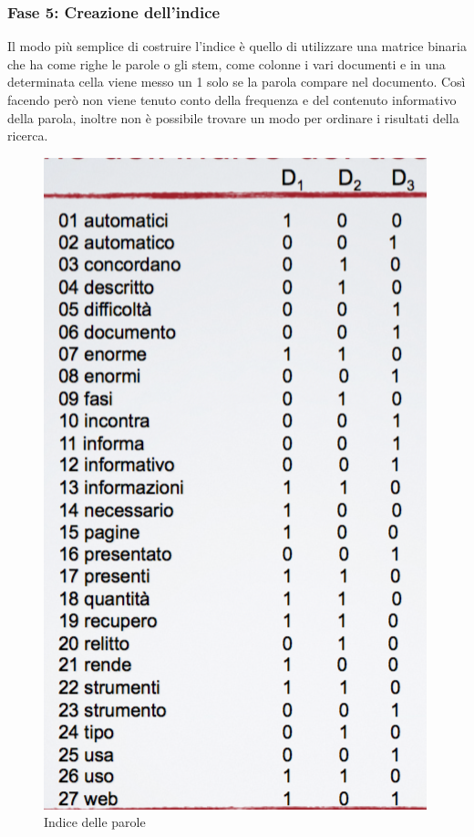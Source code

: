\subsubsection{Fase 5: Creazione dell'indice}

Il modo più semplice di costruire l'indice è quello di utilizzare una matrice binaria che ha come righe le parole o gli stem, come colonne i vari documenti e in una determinata cella viene messo un 1 solo se la parola compare nel documento.
Così facendo però non viene tenuto conto della frequenza e del contenuto informativo della parola, inoltre non è possibile trovare un modo per ordinare i risultati della ricerca.

\begin{figure}[ht]
\centering
\begin{minipage}[b]{0.45\linewidth}
		\centering
  \includegraphics[width=0.7\linewidth]{images/l5-index-1}
  \caption{Indice delle parole}


\end{minipage}
\end{figure}
